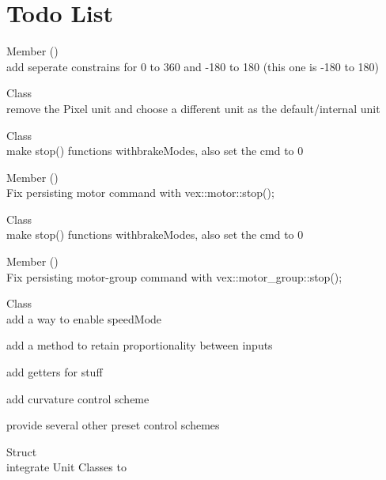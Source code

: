 \chapter{Todo List}
\hypertarget{todo}{}\label{todo}

\begin{DoxyRefList}
\item[Member \doxylink{classart_1_1_angle_ace8d0ebeae58b407fca15f951816e578}{art\+::Angle\+::constrain} ()]\hfill \\
\label{todo__todo000007}%
%
add seperate constrains for 0 to 360 and -\/180 to 180 (this one is -\/180 to 180) 
\item[Class \doxylink{classart_1_1_length}{art\+::Length} ]\hfill \\
\label{todo__todo000006}%
%
remove the Pixel unit and choose a different unit as the default/internal unit  
\item[Class \doxylink{classart_1_1_simple_motor}{art\+::Simple\+Motor} ]\hfill \\
\label{todo__todo000001}%
%
make stop() functions withbrake\+Modes, also set the cmd to 0  
\item[Member \doxylink{classart_1_1_simple_motor_aa3d8f01a6a434cdb8d6559dfe7b8d642}{art\+::Simple\+Motor\+::get} ()]\hfill \\
\label{todo__todo000002}%
%
Fix persisting motor command with vex\+::motor\+::stop(); 
\item[Class \doxylink{classart_1_1_simple_motor_group}{art\+::Simple\+Motor\+Group} ]\hfill \\
\label{todo__todo000003}%
%
make stop() functions withbrake\+Modes, also set the cmd to 0  
\item[Member \doxylink{classart_1_1_simple_motor_group_ae7e407ee8ae8e4c8456606cc1fcedf47}{art\+::Simple\+Motor\+Group\+::get} ()]\hfill \\
\label{todo__todo000004}%
%
Fix persisting motor-\/group command with vex\+::motor\+\_\+group\+::stop(); 
\item[Class \doxylink{classart_1_1_tank_drive}{art\+::Tank\+Drive} ]\hfill \\
\label{todo__todo000005}%
%
add a way to enable speed\+Mode 



add a method to retain proportionality between inputs 



add getters for stuff 



add curvature control scheme 



provide several other preset control schemes  
\item[Struct \doxylink{structart_1_1_vec2}{art\+::Vec2} ]\hfill \\
\label{todo__todo000008}%
%
integrate Unit Classes to  
\end{DoxyRefList}